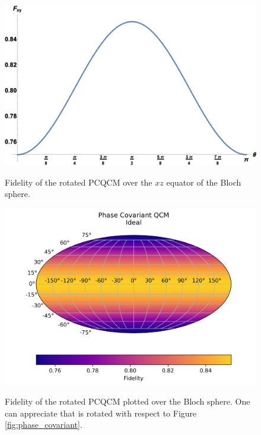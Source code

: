 \begin{figure}[H]
\centering
    \begin{minipage}[t]{.5\textwidth}
        \centering
        \includegraphics[width=\textwidth]{Figures/plot_1D_phase_covariant_different_labels.png}
        \label{fig:phase_covariant_rotated_1d}
        \caption{Fidelity of the rotated PCQCM over the $xz$ equator of the Bloch sphere.}
    \end{minipage}%
    \begin{minipage}[t]{.5\textwidth}
        \centering
        \includegraphics[width=\textwidth]{Figures/phase_covariant_rotated.png}
        \label{fig:phase_covariant_rotated}
        \caption{Fidelity of the rotated PCQCM plotted over the Bloch sphere. One can appreciate that is rotated with respect to Figure \ref{fig:phase_covariant}.}
    \end{minipage}
\end{figure}

